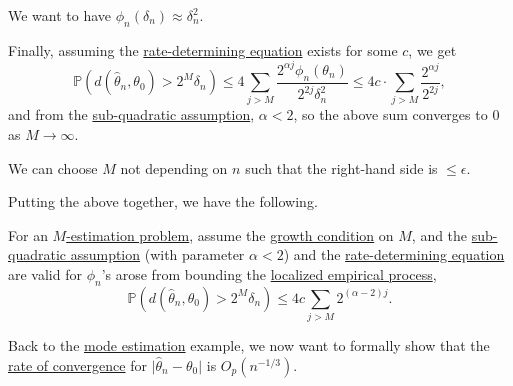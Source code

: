 \begin{intuition}
	We want to have \(\phi _n(\delta _n) \approx \delta _n^2\).
\end{intuition}

Finally, assuming the \hyperref[def:rate-determining-equation]{rate-determining equation} exists for some \(c\), we get
\[
	\mathbb{P} (d(\hat{\theta} _n, \theta _0) > 2^M \delta _n)
	\leq 4 \sum_{j > M} \frac{2^{\alpha j} \phi _n(\theta _n)}{2^{2j} \delta _n^2}
	\leq 4c\cdot \sum_{j > M} \frac{2^{\alpha j}}{2^{2j}} ,
\]
and from the \hyperref[def:sub-quadratic-assumption]{sub-quadratic assumption}, \(\alpha < 2\), so the above sum converges to \(0\) as \(M \to \infty \).

\begin{remark}
	We can choose \(M\) not depending on \(n\) such that the right-hand side is \(\leq \epsilon \).
\end{remark}

Putting the above together, we have the following.
\begin{theorem}\label{thm:non-asymptotic-rate-of-convergence}
	For an \hyperref[prb:M-estimation]{\(M\)-estimation problem}, assume the \hyperref[def:growth-condition*]{growth condition} on \(M\), and the \hyperref[def:sub-quadratic-assumption]{sub-quadratic assumption} (with parameter \(\alpha < 2\)) and the \hyperref[def:rate-determining-equation]{rate-determining equation} are valid for \(\phi _n\)'s arose from bounding the \hyperref[def:localized-EP]{localized empirical process},
	\[
		\mathbb{P} (d(\hat{\theta} _n, \theta _0) > 2^M \delta _n) \leq 4c \sum_{j > M} 2^{(\alpha -2) j}.
	\]
\end{theorem}

Back to the \hyperref[eg:mode-estimation]{mode estimation} example, we now want to formally show that the \hyperref[def:rate-of-convergence]{rate of convergence} for \(\vert \hat{\theta} _n - \theta _0 \vert \) is \(O_p(n^{-1 / 3})\).

